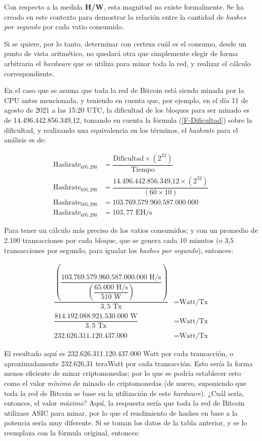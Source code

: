 \documentclass[12pt,a4paper,twoside]{book}
\begin{document}
\vspace{0.25cm}

Con respecto a la medida \textbf{H/W}, esta magnitud no existe formalmente. Se ha creado en este contexto para demostrar la relación entre la cantidad de \textit{hashes por segundo} por cada vatio consumido.

Si se quiere, por lo tanto, determinar con certeza cuál es el consumo, desde un punto de vista aritmético, no quedará otra que simplemente elegir de forma arbitraria el \textit{hardware} que se utiliza para minar toda la red, y realizar el cálculo correspondiente.

En el caso que se asuma que toda la red de Bitcoin está siendo minada por la CPU antes mencionada, y teniendo en cuenta que, por ejemplo, en el día 11 de agosto de 2021 a las 15:20 UTC, la dificultad de los bloques para ser minado es de 14.496.442.856.349,12, tomando en cuenta la fórmula (\ref{F-Dificultad}) sobre la dificultad, y realizando una equivalencia en los términos, el \textit{hashrate} para el análisis es de:

\begin{align*}
\text{Hashrate}_{695.290} &= \dfrac{\text{Dificultad} \times \left( 2^{32} \right)}{\text{Tiempo}} \\
\text{Hashrate}_{695.290} &= \dfrac{\text{14.496.442.856.349,12} \times \left( 2^{32} \right)}{\left( 60 \times 10 \right)} \\
\text{Hashrate}_{695.290} &= 103.769.579.960.587.000.000 \\
\text{Hashrate}_{695.290} &= 103,77 \text{ EH/s}
\end{align*}

Para tener un cálculo más preciso de los vatios consumidos; y con un promedio de 2.100 transacciones por cada bloque, que se genera cada 10 minutos (o 3,5 transacciones por segundo, para igualar los \textit{hashes por segundo}), entonces:

\begin{align*}
\dfrac{\left( \dfrac{103.769.579.960.587.000.000 \text{ H/s}}{\left( \dfrac{65.000 \text{ H/s}}{510 \text{ W}} \right)} \right)}{3,5 \text{ Tx}} &= \text{Watt/Tx} \\
\dfrac{814.192.088.921.530.000 \text{ W}}{3,5 \text{ Tx}} &= \text{Watt/Tx} \\
232.626.311.120.437.000 &= \text{Watt/Tx}
\end{align*}

El resultado aquí es 232.626.311.120.437.000 Watt por cada transacción, o aproximadamente 232.626,31 teraWatt por cada transacción. Esto sería la forma menos eficiente de minar criptomonedas; por lo que se podría establecer esto como el valor \textit{mínimo} de minado de criptomonedas (de nuevo, suponiendo que toda la red de Bitcoin se base en la utilización de este \textit{hardware}). ¿Cuál sería, entonces, el valor \textit{máximo}? Aquí, la respuesta sería que toda la red de Bitcoin utilizase ASIC para minar, por lo que el rendimiento de hashes en base a la potencia sería muy diferente. Si se toman los datos de la tabla anterior, y se lo reemplaza con la fórmula original, entonces:
\end{document}
